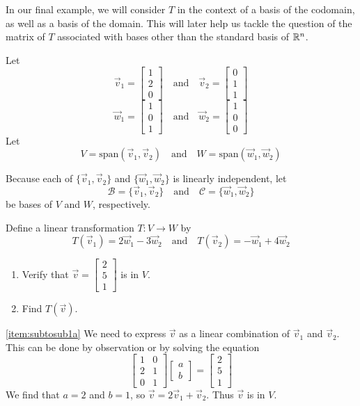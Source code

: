 \documentclass{ximera}
\begin{document}
In our final example, we will consider $T$ in the context of a basis of the codomain, as well as a basis of the domain.  This will later help us tackle the question of the matrix of $T$ associated with bases other than the standard basis of $\mathbb{R}^n$.

\begin{example}\label{ex:subtosub1}
Let
$$\vec{v}_1=\begin{bmatrix}1\\2\\0\end{bmatrix}\quad\text{and}\quad\vec{v}_2=\begin{bmatrix}0\\1\\1\end{bmatrix}$$
$$\vec{w}_1=\begin{bmatrix}1\\0\\1\end{bmatrix}\quad\text{and}\quad\vec{w}_2=\begin{bmatrix}1\\0\\0\end{bmatrix}$$
Let $$V=\text{span}(\vec{v}_1, \vec{v}_2)\quad\text{and}\quad W=\text{span}(\vec{w}_1, \vec{w}_2)$$

Because each of $\{\vec{v}_1, \vec{v}_2\}$ and $\{\vec{w}_1, \vec{w}_2\}$ is linearly independent, let 
$$\mathcal{B}=\{\vec{v}_1, \vec{v}_2\}\quad\text{and}\quad\mathcal{C}=\{\vec{w}_1, \vec{w}_2\}$$
be bases of $V$ and $W$, respectively.


Define a linear transformation $T:V\rightarrow W$ by 
$$T(\vec{v}_1)=2\vec{w}_1-3\vec{w}_2\quad\text{and} \quad T(\vec{v}_2)=-\vec{w}_1+4\vec{w}_2$$

\begin{enumerate}
\item \label{item:subtosub1a}
Verify that $\vec{v}=\begin{bmatrix}2\\5\\1\end{bmatrix}$ is in $V$.
\item\label{item:subtosub1b}
Find $T(\vec{v})$.
\end{enumerate}
\begin{explanation}
\ref{item:subtosub1a} We need to express $\vec{v}$ as a linear combination of $\vec{v}_1$ and $\vec{v}_2$.  This can be done by observation or by solving the equation
$$\begin{bmatrix}1&0\\2&1\\0&1\end{bmatrix}\begin{bmatrix}a\\b\end{bmatrix}=\begin{bmatrix}2\\5\\1\end{bmatrix}$$
We find that $a=2$ and $b=1$, so $\vec{v}=2\vec{v}_1+\vec{v}_2$.  Thus $\vec{v}$ is in $V$.


\end{explanation}
\end{example}
\end{document}
